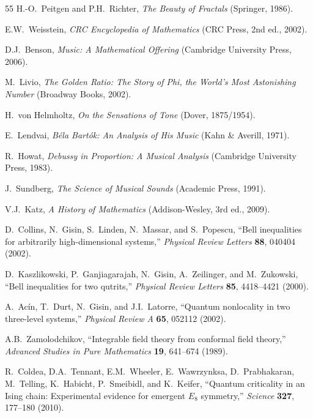 \documentclass[aps,prd,preprint,superscriptaddress,showpacs,nofootinbib,longbibliography]{revtex4-2}
\begin{document}
\begin{thebibliography}{55}
H.-O.~Peitgen and P.H.~Richter,
\textit{The Beauty of Fractals} (Springer, 1986).

E.W.~Weisstein,
\textit{CRC Encyclopedia of Mathematics} (CRC Press, 2nd ed., 2002).

D.J.~Benson,
\textit{Music: A Mathematical Offering} (Cambridge University Press, 2006).

M.~Livio,
\textit{The Golden Ratio: The Story of Phi, the World's Most Astonishing Number} (Broadway Books, 2002).

H.~von Helmholtz,
\textit{On the Sensations of Tone} (Dover, 1875/1954).

E.~Lendvai,
\textit{B\'ela Bart\'ok: An Analysis of His Music} (Kahn \& Averill, 1971).

R.~Howat,
\textit{Debussy in Proportion: A Musical Analysis} (Cambridge University Press, 1983).

J.~Sundberg,
\textit{The Science of Musical Sounds} (Academic Press, 1991).

V.J.~Katz,
\textit{A History of Mathematics} (Addison-Wesley, 3rd ed., 2009).

D.~Collins, N.~Gisin, S.~Linden, N.~Massar, and S.~Popescu,
``Bell inequalities for arbitrarily high-dimensional systems,''
\textit{Physical Review Letters} \textbf{88}, 040404 (2002).

D.~Kaszlikowski, P.~Ganjiagarajah, N.~Gisin, A.~Zeilinger, and M.~Zukowski,
``Bell inequalities for two qutrits,''
\textit{Physical Review Letters} \textbf{85}, 4418--4421 (2000).

A.~Acín, T.~Durt, N.~Gisin, and J.I.~Latorre,
``Quantum nonlocality in two three-level systems,''
\textit{Physical Review A} \textbf{65}, 052112 (2002).

A.B.~Zamolodchikov,
``Integrable field theory from conformal field theory,''
\textit{Advanced Studies in Pure Mathematics} \textbf{19}, 641--674 (1989).

R.~Coldea, D.A.~Tennant, E.M.~Wheeler, E.~Wawrzynksa, D.~Prabhakaran, M.~Telling, K.~Habicht, P.~Smeibidl, and K.~Keifer,
``Quantum criticality in an Ising chain: Experimental evidence for emergent $E_8$ symmetry,''
\textit{Science} \textbf{327}, 177--180 (2010).


\end{thebibliography}
\end{document}

